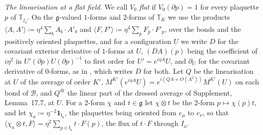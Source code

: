 \documentclass[11pt]{preprint}
\numberwithin{equation}{section}
\theoremstyle{definition}
\theoremstyle{remark}
\theoremstyle{plain}
\begin{document}
\emph{The linearisation at a flat field.} We call $V_0$ \emph{flat} if $V_0(\partial p) = 1$ for every plaquette $p$ of $\mathbb T_{j_q}$. On the $\mathfrak g$-valued $1$-forms and $2$-forms of $\mathbb T_K$ we use the products $\langle A, A'\rangle \coloneqq \eta^4\sum_bA_b \cdot A'_b$ and $\langle F, F'\rangle \coloneqq \eta^4\sum_pF_p \cdot F'_p$, over the bonds and the positively oriented plaquettes, and for a configuration $U$ we write $D$ for the covariant exterior derivative of $1$-forms at $U$, $(DA)(p)$ being the coefficient of $i\eta^2$ in $U'(\partial p)U(\partial p)^{-1}$ to first order for $U' = e^{i\eta A}U$, and $\partial_U$ for the covariant derivative of $0$-forms, as in \cite[(3.8)--(3.10), p.~392]{BalabanPBG}, which writes $D$ for both. Let $Q$ be the linearisation at $U$ of the average of order $K'$, $M^{K'}(e^{i\eta A}U) = e^{i(QA + O(A^2))}M^{K'}(U)$ on each bond of $\mathcal B$, and $Q^{\mathrm{dr}}$ the linear part of the dressed average of Supplement, Lemma~17.7, at $U$. For a $2$-form $\chi$ and $t \in \mathfrak g$ let $\chi \otimes t$ be the $2$-form $p \mapsto \chi(p)t$, and let $\chi_a \coloneqq \eta^{-2}\mathbf 1_{\mathsf I_a}$, the plaquettes being oriented from $e_\mu$ to $e_\nu$, so that $\langle\chi_a \otimes t, F\rangle = \eta^2\sum_{p \in \mathsf I_a}t \cdot F(p)$, the flux of $t \cdot F$ through $I_a$.
\end{document}
